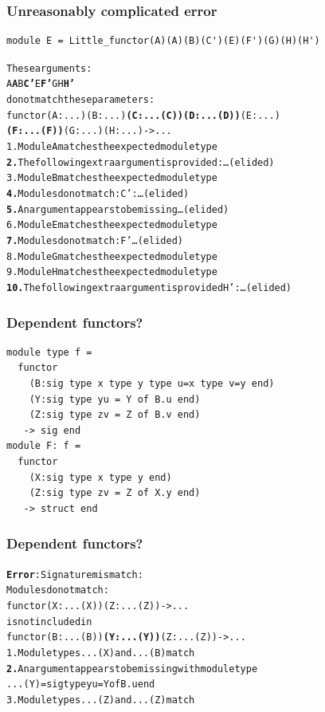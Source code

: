\documentclass[11pt,aspectratio=169]{beamer}
\begin{document}
\begin{frame}[fragile]\frametitle{Unreasonably complicated error}
\begin{verbatim}
module E = Little_functor(A)(A)(B)(C')(E)(F')(G)(H)(H')
\end{verbatim}
  \footnotesize
\begin{alltt}
These arguments:
  {\color{green}{}A} {\color{red}{}\bfseries{}A} {\color{green}{}B} {\color{magenta}{}\bfseries{}C'} {\color{red}{}\bfseries{}} {\color{green}{}E} {\color{magenta}{}\bfseries{}F'} {\color{green}{}G} {\color{green}{}H} {\color{red}{}\bfseries{}H'}
do not match these parameters:
  functor {\color{green}{}(A : ...)} {\color{red}{}\bfseries{}} {\color{green}{}(B : ...)} {\color{magenta}{}\bfseries{}(C : ...(C))} {\color{red}{}\bfseries{}(D : ...(D))} {\color{green}{}(E : ...)}
  {\color{magenta}{}\bfseries{}(F : ...(F))} {\color{green}{}(G : ...)} {\color{green}{}(H : ...)} {\color{red}{}\bfseries{}} -> ...
{\color{green}{}1.} Module A matches the expected module type
{\color{red}{}\bfseries{}2.} The following extra argument is provided: \dots(elided)
{\color{green}{}3.} Module B matches the expected module type
{\color{magenta}{}\bfseries{}4.} Modules do not match: C' : \dots(elided)
{\color{red}{}\bfseries{}5.} An argument appears to be missing \dots(elided)
{\color{green}{}6.} Module E matches the expected module type
{\color{magenta}{}\bfseries{}7.} Modules do not match: F' \dots(elided)
{\color{green}{}8.} Module G matches the expected module type
{\color{green}{}9.} Module H matches the expected module type
{\color{red}{}\bfseries{}10.} The following extra argument is provided H' : \dots(elided)
\end{alltt}
\end{frame}



\begin{frame}[fragile]\frametitle{Dependent functors?}
\begin{verbatim}
module type f =
  functor
    (B:sig type x type y type u=x type v=y end)
    (Y:sig type yu = Y of B.u end)
    (Z:sig type zv = Z of B.v end)
   -> sig end
module F: f =
  functor
    (X:sig type x type y end)
    (Z:sig type zv = Z of X.y end)
   -> struct end
\end{verbatim}
\end{frame}

\begin{frame}[fragile]\frametitle{Dependent functors?}
\begin{alltt}
{\bfseries{}\color{red}{}Error}: Signature mismatch:
       Modules do not match:
         functor {\color{green}{}(X : ...(X))} {\color{red}{}\bfseries{}} {\color{green}{}(Z : ...(Z))} -> ...
       is not included in
         functor {\color{green}{}(B : ...(B))} {\color{red}{}\bfseries{}(Y : ...(Y))} {\color{green}{}(Z : ...(Z))} -> ...
  {\color{green}{}1.} Module types ...(X) and ...(B) match
  {\color{red}{}\bfseries{}2.} An argument appears to be missing with module type
         ...(Y) = sig type yu = Y of B.u end
  {\color{green}{}3.} Module types ...(Z) and ...(Z) match
\end{alltt}
\end{frame}
\end{document}
